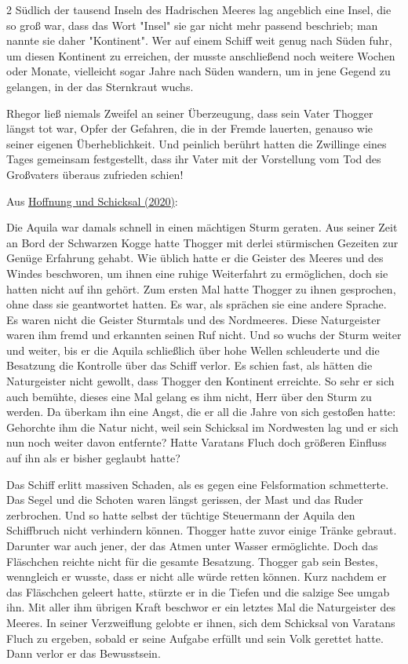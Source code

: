 \documentclass[10pt, a4paper, oneside]{book}
\begin{document}
\begin{multicols}{2}
Südlich der tausend Inseln des Hadrischen Meeres lag angeblich eine Insel, die so groß war, dass das Wort "Insel" sie gar nicht mehr passend beschrieb; man nannte sie daher "Kontinent". Wer auf einem Schiff weit genug nach Süden fuhr, um diesen Kontinent zu erreichen, der musste anschließend noch weitere Wochen oder Monate, vielleicht sogar Jahre nach Süden wandern, um in jene Gegend zu gelangen, in der das Sternkraut wuchs. 

Rhegor ließ niemals Zweifel an seiner Überzeugung, dass sein Vater Thogger längst tot war, Opfer der Gefahren, die in der Fremde lauerten, genauso wie seiner eigenen Überheblichkeit. Und peinlich berührt hatten die Zwillinge eines Tages gemeinsam festgestellt, dass ihr Vater mit der Vorstellung vom Tod des Großvaters überaus zufrieden schien!

\begin{center}
    Aus \hyperref[storytext-2020-hoffnung-und-schicksal]{Hoffnung und Schicksal (2020)}:
\end{center}

Die Aquila war damals schnell in einen mächtigen Sturm geraten. Aus seiner Zeit an Bord der Schwarzen Kogge hatte Thogger mit derlei stürmischen Gezeiten zur Genüge Erfahrung gehabt. Wie üblich hatte er die Geister des Meeres und des Windes beschworen, um ihnen eine ruhige Weiterfahrt zu ermöglichen, doch sie hatten nicht auf ihn gehört. Zum ersten Mal hatte Thogger zu ihnen gesprochen, ohne dass sie geantwortet hatten. Es war, als sprächen sie eine andere Sprache. Es waren nicht die Geister Sturmtals und des Nordmeeres. Diese Naturgeister waren ihm fremd und erkannten seinen Ruf nicht. Und so wuchs der Sturm weiter und weiter, bis er die Aquila schließlich über hohe Wellen schleuderte und die Besatzung die Kontrolle über das Schiff verlor. Es schien fast, als hätten die Naturgeister nicht gewollt, dass Thogger den Kontinent erreichte. So sehr er sich auch bemühte, dieses eine Mal gelang es ihm nicht, Herr über den Sturm zu werden. Da überkam ihn eine Angst, die er all die Jahre von sich gestoßen hatte: Gehorchte ihm die Natur nicht, weil sein Schicksal im Nordwesten lag und er sich nun noch weiter davon entfernte? Hatte Varatans Fluch doch größeren Einfluss auf ihn als er bisher geglaubt hatte?\bigskip

Das Schiff erlitt massiven Schaden, als es gegen eine Felsformation schmetterte. Das Segel und die Schoten waren längst gerissen, der Mast und das Ruder zerbrochen. Und so hatte selbst der tüchtige Steuermann der Aquila den Schiffbruch nicht verhindern können. Thogger hatte zuvor einige Tränke gebraut. Darunter war auch jener, der das Atmen unter Wasser ermöglichte. Doch das Fläschchen reichte nicht für die gesamte Besatzung. Thogger gab sein Bestes, wenngleich er wusste, dass er nicht alle würde retten können. Kurz nachdem er das Fläschchen geleert hatte, stürzte er in die Tiefen und die salzige See umgab ihn. Mit aller ihm übrigen Kraft beschwor er ein letztes Mal die Naturgeister des Meeres. In seiner Verzweiflung gelobte er ihnen, sich dem Schicksal von Varatans Fluch zu ergeben, sobald er seine Aufgabe erfüllt und sein Volk gerettet hatte. Dann verlor er das Bewusstsein.\bigskip


\end{multicols}
\end{document}
